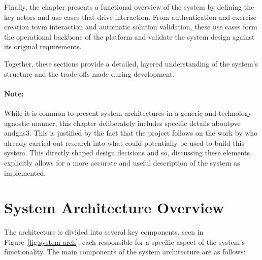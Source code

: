 Finally, the chapter presents a functional overview of the system by defining the key actors and use cases that drive interaction. From 
authentication and exercise creation to\ac{vm} interaction and automatic solution validation, these use cases form the operational 
backbone of the platform and validate the system design against its original requirements.

Together, these sections provide a detailed, layered understanding of the system's structure and the trade-offs made during development.

\paragraph{Note:} While it is common to present system architectures in a generic and technology-agnostic manner, this chapter 
deliberately includes specific details about\ac{pve} and\ac{gns3}. This is justified by the fact that the project follows on the work by
\citet{santos2024} who already carried out research into what could potentially be used to build this system. This directly 
shaped design decisions and so, discussing these elements explicitly allows for a more accurate and useful description of the system as implemented.

\section{System Architecture Overview}
    The architecture is divided into several key components, seen in Figure~\ref{fig:system-arch}, each responsible for a specific aspect 
    of the system's functionality. The main components of the system architecture are as follows:

